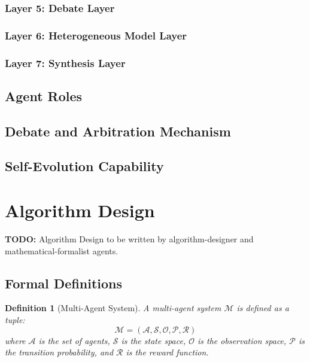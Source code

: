 \documentclass[10pt,journal,compsoc]{IEEEtran}
\newtheorem{definition}{Definition}
\newcommand{\agentset}{\mathcal{A}}
\begin{document}
\subsubsection{Layer 5: Debate Layer}
\label{subsubsec:layer5}

\subsubsection{Layer 6: Heterogeneous Model Layer}
\label{subsubsec:layer6}

\subsubsection{Layer 7: Synthesis Layer}
\label{subsubsec:layer7}

\subsection{Agent Roles}
\label{subsec:agent-roles}

\subsection{Debate and Arbitration Mechanism}
\label{subsec:debate}

\subsection{Self-Evolution Capability}
\label{subsec:self-evolution}

\section{Algorithm Design}
\label{sec:algorithm}
\textbf{TODO:} Algorithm Design to be written by algorithm-designer and mathematical-formalist agents.

\subsection{Formal Definitions}
\label{subsec:definitions}

\begin{definition}[Multi-Agent System]
\label{def:mas}
A multi-agent system $\mathcal{M}$ is defined as a tuple:
\begin{equation}
\mathcal{M} = (\agentset, \mathcal{S}, \mathcal{O}, \mathcal{P}, \mathcal{R})
\end{equation}
where $\agentset$ is the set of agents, $\mathcal{S}$ is the state space, $\mathcal{O}$ is the observation space, $\mathcal{P}$ is the transition probability, and $\mathcal{R}$ is the reward function.
\end{definition}
\end{document}
